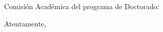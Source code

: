 \documentclass[10pt]{letter}
\begin{document}
\begin{letter}{}

\opening{Comisión Académica del programa de Doctorado:}


\closing{Atentamente,}


\end{letter}
\end{document}
